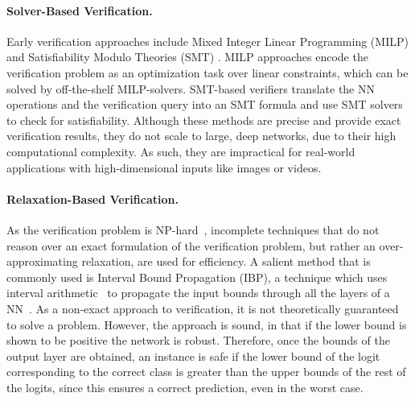 \paragraph{Solver-Based Verification.}
Early verification approaches include Mixed Integer Linear Programming (MILP) \cite{lomuscio2017approach,tjeng2018evaluating,henriksen2020efficient} and Satisfiability Modulo Theories (SMT) \cite{ehlers2017formal,katz2017reluplex}. MILP approaches encode the verification problem as an optimization task over linear constraints, which can be solved by off-the-shelf MILP-solvers. SMT-based verifiers translate the NN operations and the verification query into an SMT formula and use SMT solvers to check for satisfiability. Although these methods are precise and provide exact verification results, they do not scale to large, deep networks, due to their high computational complexity. As such, they are impractical for real-world applications with high-dimensional inputs like images or videos.

\paragraph{Relaxation-Based Verification.}
As the verification problem is NP-hard~\cite{katz2017reluplex}, incomplete techniques that do not reason over an exact formulation of the verification problem, but rather an over-approximating relaxation, are used for efficiency. A salient method that is commonly used is Interval Bound Propagation (IBP), a technique which uses interval arithmetic~\cite{intervalArithmeticSunaga1958} to propagate the input bounds through all the layers of a NN~\cite{gowal2018ibp}. As a non-exact approach to verification, it is not theoretically guaranteed to solve a problem. However, the approach is sound, in that if the lower bound is shown to be positive the network is robust. Therefore, once the bounds of the output layer are obtained, an instance is safe if the lower bound of the logit corresponding to the correct class is greater than the upper bounds of the rest of the logits, since this ensures a correct prediction, even in the worst case.


